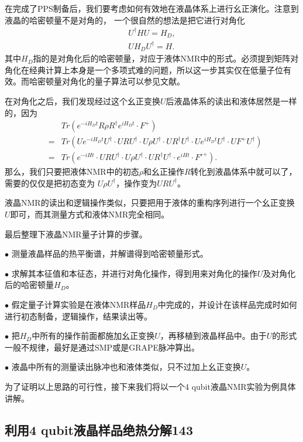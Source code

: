 在完成了PPS制备后，我们要考虑如何有效地在液晶体系上进行幺正演化。注意到液晶的哈密顿量不是对角的，
一个很自然的想法是把它进行对角化
\begin{eqnarray}\label{aaa}
U^{\dagger} H U = H_D, \nonumber \\
UH_DU^{\dagger}  = H.
\end{eqnarray}
其中$H_D$指的是对角化后的哈密顿量，对应于液体NMR中的形式。必须提到矩阵对角化在经典计算上本身是一个多项式难的问题，所以这一步其实仅在低量子位有效。而哈密顿量对角化的量子算法可以参见文献\cite{lq7}。

在对角化之后，我们发现经过这个幺正变换$U$后液晶体系的读出和液体居然是一样的，因为
\begin{eqnarray}
&&Tr(e^{-iH_Dt}R\rho R^{\dagger}e^{iH_Dt}\cdot F^{+}) \nonumber \\
&=&Tr(Ue^{-iH_Dt}U^{\dagger}\cdot  URU^{\dagger} \cdot  U \rho U^{\dagger}  \cdot  U  R^{\dagger} U^{\dagger} \cdot  U e^{iH_Dt} U^{\dagger}  \cdot  U  F^{+} U^{\dagger}) \nonumber \\
&=&Tr(e^{-iHt}\cdot  URU^{\dagger} \cdot  U \rho U^{\dagger}  \cdot  U  R^{\dagger} U^{\dagger} \cdot  e^{iHt} \cdot  F'^{+} ).
\end{eqnarray}
那么，我们只要把液体NMR中的初态$\rho$和幺正操作$R$转化到液晶体系中就可以了，需要的仅仅是把初态变为
$U \rho U^{\dagger}$，操作变为$ URU^{\dagger}$。

液晶NMR的读出和逻辑操作类似，只要把用于液体的重构序列进行一个幺正变换$U$即可，而其测量方式和液体NMR完全相同。

最后整理下液晶NMR量子计算的步骤。

$\bullet$ 测量液晶样品的热平衡谱，并解谱得到哈密顿量形式。

$\bullet$ 求解其本征值和本征态，并进行对角化操作，得到用来对角化的操作$U$及对角化后的哈密顿量$H_D$。

$\bullet$  假定量子计算实验是在液体NMR样品$H_D$中完成的，并设计在该样品完成时如何进行初态制备，逻辑操作，结果读出等。

$\bullet$ 把$H_D$中所有的操作前面都施加幺正变换$U$，再移植到液晶样品中。由于$U$的形式一般不规律，最好是通过SMP或是GRAPE脉冲算出。

$\bullet$  液晶中所有的测量读出脉冲也和液体类似，只不过加上幺正变换$U$。

为了证明以上思路的可行性，接下来我们将以一个4 qubit液晶NMR实验为例具体讲解。

\subsection{利用4 qubit液晶样品绝热分解143}

